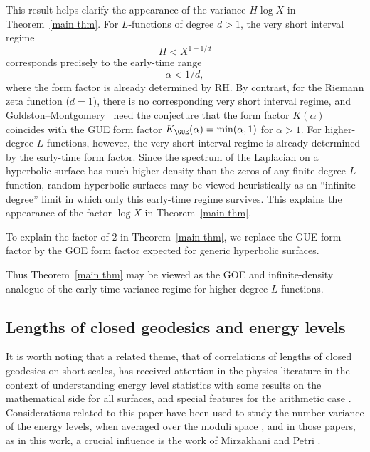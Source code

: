 \documentclass[12pt]{amsart}
\begin{document}

This result helps clarify the appearance of the variance $H\log X$
in Theorem~\ref{main thm}. For $L$-functions of degree $d>1$, the very short interval regime
\[
H<X^{1-1/d}
\]
corresponds precisely to the early-time range
\[
\alpha<1/d,
\]
where the form factor is already determined by RH. By contrast,
for the Riemann zeta function ($d=1$), there is no corresponding very short interval regime,    %
  and Goldston--Montgomery~\cite{GM} need the conjecture that the form factor $K(\alpha)$ coincides with the GUE form factor $K_{\GUE}(\alpha)= \min(\alpha,1)$ for $\alpha>1$.   For higher-degree
$L$-functions, however, the very short interval regime is already
determined by the early-time form factor. Since the spectrum of the
Laplacian on a hyperbolic surface has much higher density than the
zeros of any finite-degree $L$-function, random hyperbolic surfaces
may be viewed heuristically as an ``infinite-degree'' limit in
which only this early-time regime survives.
This explains  the appearance of the factor $\log X$ in
Theorem~\ref{main thm}.   

To explain   the  factor of $2$ in Theorem~\ref{main thm}, we replace  the GUE form factor by the GOE form factor expected for
generic hyperbolic surfaces.

Thus Theorem~\ref{main thm} may be viewed as the GOE and infinite-density
analogue of the early-time variance regime for higher-degree
$L$-functions.

\subsection{Lengths of closed geodesics and energy levels} 
It is worth noting that a related theme, that of correlations of lengths of closed geodesics on short scales,  has received attention in the physics literature in the context of understanding energy level statistics \cite{Argaman et al} with some  results on the mathematical side \cite{PS} for all surfaces, and special features for the arithmetic case \cite{LRSgeodsics}. Considerations related to this paper have been used to study the number variance  of the energy levels, when averaged over the moduli space \cite{RudGOE, RudWigmanCLT, RudWigmanAS, MarklofMonk}, and in those papers, as in this work, a crucial influence is the work of Mirzakhani and Petri \cite{MP}. 
\end{document}
